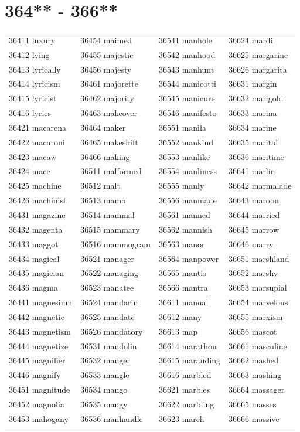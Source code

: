 \documentclass[10pt, oneside]{book}
\begin{document}
\begin{table}
	\centering
	\section*{364** - 366**}
	\begin{tabular}{l l l l}
36411 luxury &36454 maimed &36541 manhole &36624 mardi\\
36412 lying &36455 majestic &36542 manhood &36625 margarine\\
36413 lyrically &36456 majesty &36543 manhunt &36626 margarita\\
36414 lyricism &36461 majorette &36544 manicotti &36631 margin\\
36415 lyricist &36462 majority &36545 manicure &36632 marigold\\
36416 lyrics &36463 makeover &36546 manifesto &36633 marina\\
36421 macarena &36464 maker &36551 manila &36634 marine\\
36422 macaroni &36465 makeshift &36552 mankind &36635 marital\\
36423 macaw &36466 making &36553 manlike &36636 maritime\\
36424 mace &36511 malformed &36554 manliness &36641 marlin\\
36425 machine &36512 malt &36555 manly &36642 marmalade\\
36426 machinist &36513 mama &36556 manmade &36643 maroon\\
36431 magazine &36514 mammal &36561 manned &36644 married\\
36432 magenta &36515 mammary &36562 mannish &36645 marrow\\
36433 maggot &36516 mammogram &36563 manor &36646 marry\\
36434 magical &36521 manager &36564 manpower &36651 marshland\\
36435 magician &36522 managing &36565 mantis &36652 marshy\\
36436 magma &36523 manatee &36566 mantra &36653 marsupial\\
36441 magnesium &36524 mandarin &36611 manual &36654 marvelous\\
36442 magnetic &36525 mandate &36612 many &36655 marxism\\
36443 magnetism &36526 mandatory &36613 map &36656 mascot\\
36444 magnetize &36531 mandolin &36614 marathon &36661 masculine\\
36445 magnifier &36532 manger &36615 marauding &36662 mashed\\
36446 magnify &36533 mangle &36616 marbled &36663 mashing\\
36451 magnitude &36534 mango &36621 marbles &36664 massager\\
36452 magnolia &36535 mangy &36622 marbling &36665 masses\\
36453 mahogany &36536 manhandle &36623 march &36666 massive\\
	\end{tabular}
 \end{table}
\clearpage
\end{document}
